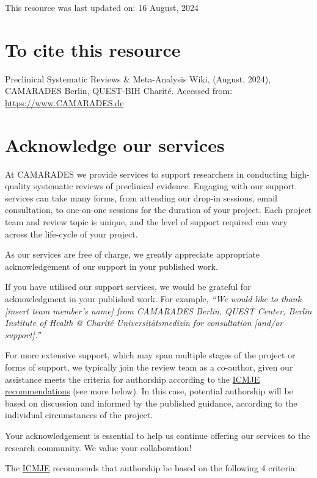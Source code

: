 \documentclass[
]{book}
\begin{document}
This resource was last updated on: 16 August, 2024

\section{To cite this resource}\label{to-cite-this-resource}

Preclinical Systematic Reviews \& Meta-Analysis Wiki, (August, 2024), CAMARADES Berlin, QUEST-BIH Charité. Accessed from: \url{https://www.CAMARADES.de}

\section{Acknowledge our services}\label{acknowledge-our-services}

At CAMARADES we provide services to support researchers in conducting high-quality systematic reviews of preclinical evidence. Engaging with our support services can take many forms, from attending our drop-in sessions, email consultation, to one-on-one sessions for the duration of your project. Each project team and review topic is unique, and the level of support required can vary across the life-cycle of your project.

As our services are free of charge, we greatly appreciate appropriate acknowledgement of our support in your published work.

If you have utilised our support services, we would be grateful for acknowledgment in your published work. For example, \emph{``We would like to thank {[}insert team member's name{]} from CAMARADES Berlin, QUEST Center, Berlin Institute of Health @ Charité Universitätsmedizin for consultation {[}and/or support{]}.''}

For more extensive support, which may span multiple stages of the project or forms of support, we typically join the review team as a co-author, given our assistance meets the criteria for authorship according to the \href{https://www.icmje.org/recommendations/browse/roles-and-responsibilities/defining-the-role-of-authors-and-contributors.html}{ICMJE recommendations} (see more below). In this case, potential authorship will be based on discussion and informed by the published guidance, according to the individual circumstances of the project.

Your acknowledgement is essential to help us continue offering our services to the research community. We value your collaboration!

The \href{https://www.icmje.org/recommendations/browse/roles-and-responsibilities/defining-the-role-of-authors-and-contributors.html}{ICMJE} recommends that authorship be based on the following 4 criteria:
\end{document}
